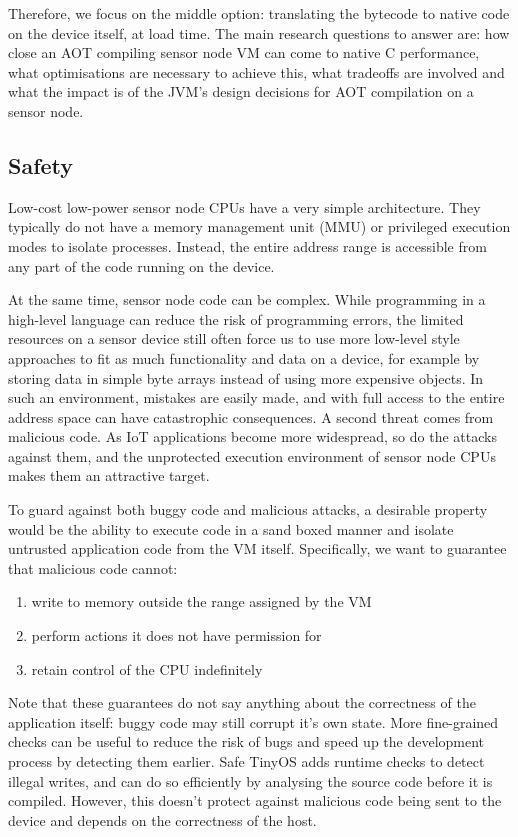 Therefore, we focus on the middle option: translating the bytecode to native code on the device itself, at load time. The main research questions to answer are: how close an AOT compiling sensor node VM can come to native C performance, what optimisations are necessary to achieve this, what tradeoffs are involved and what the impact is of the JVM's design decisions for AOT compilation on a sensor node.

\subsection{Safety}
Low-cost low-power sensor node CPUs have a very simple architecture. They typically do not have a memory management unit (MMU) or privileged execution modes to isolate processes. Instead, the entire address range is accessible from any part of the code running on the device.

At the same time, sensor node code can be complex. While programming in a high-level language can reduce the risk of programming errors, the limited resources on a sensor device still often force us to use more low-level style approaches to fit as much functionality and data on a device, for example by storing data in simple byte arrays instead of using more expensive objects. In such an environment, mistakes are easily made, and with full access to the entire address space can have catastrophic consequences. A second threat comes from malicious code. As IoT applications become more widespread, so do the attacks against them, and the unprotected execution environment of sensor node CPUs makes them an attractive target.

To guard against both buggy code and malicious attacks, a desirable property would be the ability to execute code in a sand boxed manner and isolate untrusted application code from the VM itself. Specifically, we want to guarantee that malicious code cannot:
\begin{enumerate}
	\item write to memory outside the range assigned by the VM
	\item perform actions it does not have permission for
	\item retain control of the CPU indefinitely
\end{enumerate}

Note that these guarantees do not say anything about the correctness of the application itself: buggy code may still corrupt it's own state. More fine-grained checks can be useful to reduce the risk of bugs and speed up the development process by detecting them earlier. Safe TinyOS \cite{Cooprider:2007ub} adds runtime checks to detect illegal writes, and can do so efficiently by analysing the source code before it is compiled. However, this doesn't protect against malicious code being sent to the device and depends on the correctness of the host.

